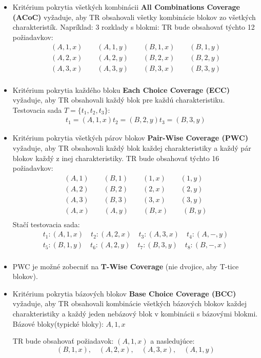 \begin{itemize}
	\item Kritérium pokrytia všetkých kombinácii \textbf{All Combinations Coverage (ACoC)} vyžaduje, aby TR obsahovali všetky kombinácie blokov zo všetkých charakteristík. 
		Napríklad: 3 rozklady s blokmi:
		TR bude obsahovať týchto 12 požiadavkov:
		\begin{eqnarray*}
			(A, 1, x) \qquad (A, 1, y) \qquad (B, 1, x) \qquad (B, 1, y) \\
			(A, 2, x) \qquad (A, 2, y) \qquad (B, 2, x) \qquad (B, 2, y) \\
			(A, 3, x) \qquad (A, 3, y) \qquad (B, 3, x) \qquad (B, 3, y) \\
		\end{eqnarray*}
	\item Kritérium pokrytia každého bloku \textbf{Each Choice Coverage (ECC)} vyžaduje, aby TR obsahovali každý blok pre každú charakteristiku.
		Testovacia sada $T = \{t_1, t_2, t_3\}$:
		\begin{eqnarray*}
			t_1 = (A, 1, x)
			t_2 = (B, 2, y)
			t_3 = (B, 3, y)
		\end{eqnarray*}
	\item Kritérium pokrytia všetkých párov blokov \textbf{Pair-Wise Coverage (PWC)} vyžaduje, aby TR obsahovali každý blok každej charakteristiky a každý pár blokov každý z inej charakteristiky.
		TR bude obsahovať týchto 16 požiadavkov:
		\begin{eqnarray*}
			(A, 1) \qquad (B, 1) \qquad (1, x) \qquad (1, y) \\
			(A, 2) \qquad (B, 2) \qquad (2, x) \qquad (2, y) \\
			(A, 3) \qquad (B, 3) \qquad (3, x) \qquad (3, y) \\
			(A, x) \qquad (A, y) \qquad (B, x) \qquad (B, y) \\
		\end{eqnarray*}
		Stačí testovacia sada:
		\begin{eqnarray*}
			t_1 : (A, 1, x) \quad t_2 : (A, 2, x) \quad t_3 : (A, 3, x) \quad t_4 : (A, -, y) \\
			t_5 : (B, 1, y) \quad t_6 : (A, 2, y) \quad t_7 : (B, 3, y) \quad t_8 : (B, -, x) \\
		\end{eqnarray*}
	\item PWC je možné zobecniť na \textbf{T-Wise Coverage} (nie dvojice, aby T-tice blokov).
	\item Kritérium pokrytia bázových blokov \textbf{Base Choice Coverage (BCC)} vyžaduje, aby TR obsahovali kombinácie všetkých bázových blokov každej charakteristiky a každý jeden nebázový blok v kombinácii s bázovými blokmi.
		Bázové bloky(typické bloky): $A, 1, x$

		TR bude obsahovať požiadavok: $(A, 1, x)$  a nasledujúce:
		\begin{equation}
			(B, 1, x), \quad (A, 2, x), \quad (A, 3, x), \quad (A, 1, y)
		\end{equation}

\end{itemize}

